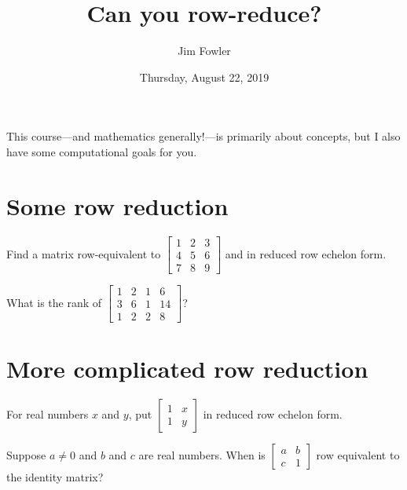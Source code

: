 \documentclass{homework}
\author{Jim Fowler}
\title{Can you row-reduce?}
\date{Thursday, August 22, 2019}
\begin{document}
\maketitle

This course---and mathematics generally!---is primarily about
concepts, but I also have some computational goals for you.

\section*{Some row reduction}

\begin{problem}
  Find a matrix row-equivalent to
\(\begin{bmatrix}
  1 & 2 & 3 \\
  4 & 5 & 6 \\
  7 & 8 & 9
\end{bmatrix}\) and in reduced row echelon form.
\end{problem}

\vfill

\begin{problem}
  What is the rank of
  \(\begin{bmatrix}
    1 & 2 & 1 & 6 \\
    3 & 6 & 1 & 14 \\
    1 & 2 & 2 & 8
  \end{bmatrix}\)?
\end{problem}

\vfill

\section*{More complicated row reduction}

\begin{problem}
  For real numbers $x$ and $y$, put
\(\begin{bmatrix}
  1 & x \\
  1 & y 
\end{bmatrix}\) in reduced row echelon form.
\end{problem}

\vfill

\begin{problem}
  Suppose $a \neq 0$ and $b$ and $c$ are real numbers.  When is
\(\begin{bmatrix}
  a & b \\
  c & 1
\end{bmatrix}\) row equivalent to the identity matrix?
\end{problem}
\end{document}
